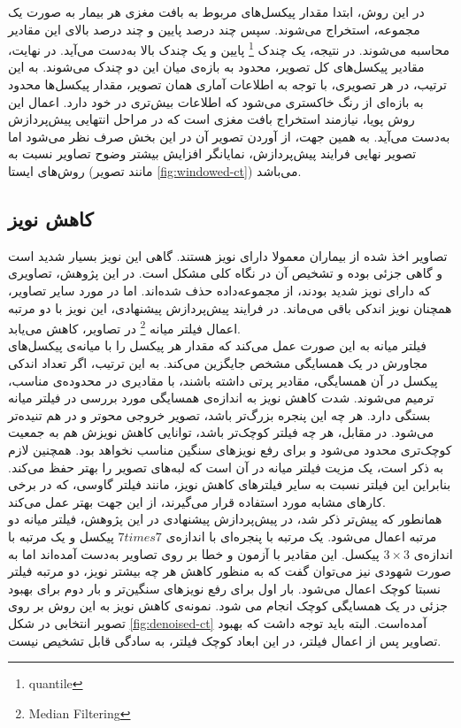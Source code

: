 در این روش، ابتدا مقدار پیکسل‌های مربوط به بافت مغزی هر بیمار به صورت یک مجموعه، استخراج می‌شوند.
سپس چند درصد پایین و چند درصد بالای این مقادیر محاسبه می‌شوند.
در نتیجه، یک چندک
\footnote{quantile} 
پایین و یک چندک بالا به‌دست می‌آید.
در نهایت، مقادیر پیکسل‌های کل تصویر، محدود به بازه‌ی میان این دو چندک می‌شوند.
به این ترتیب، در هر تصویری، با توجه به اطلاعات آماری همان تصویر، 
مقدار پیکسل‌ها محدود به بازه‌ای از رنگ خاکستری می‌شود که اطلاعات بیش‌تری در خود دارد.
اعمال این روش پویا، نیازمند استخراج بافت مغزی است که در مراحل انتهایی پیش‌پردازش به‌دست می‌آید.
به همین جهت، از آوردن تصویر آن در این بخش صرف نظر می‌شود
اما تصویر نهایی فرایند پیش‌پردازش، نمایانگر افزایش بیشتر وضوح 
تصاویر نسبت به روش‌های ایستا (مانند تصویر \ref{fig:windowed-ct}) می‌باشد.\\

\subsection{کاهش نویز}

تصاویر اخذ شده از بیماران معمولا دارای نویز هستند.
گاهی این نویز بسیار شدید است و گاهی جزئی بوده و تشخیص آن در نگاه کلی مشکل است.
در این پژوهش، تصاویری که دارای نویز شدید بودند، از مجموعه‌داده حذف شده‌اند.
اما در مورد سایر تصاویر، همچنان نویز اندکی باقی می‌ماند.
در فرایند پیش‌پردازش پیشنهادی، این نویز با دو مرتبه اعمال فیلتر میانه
\footnote{Median Filtering}
در تصاویر، کاهش می‌یابد.\\

فیلتر میانه به این صورت عمل می‌کند که مقدار هر پیکسل را 
با میانه‌ی پیکسل‌های مجاورش در یک همسایگی مشخص جایگزین می‌کند.
به این ترتیب، اگر تعداد اندکی پیکسل در آن همسایگی، مقادیر پرتی داشته باشند، با مقادیری در محدوده‌ی مناسب، ترمیم می‌شوند.
شدت کاهش نویز به اندازه‌ی همسایگی مورد بررسی در فیلتر میانه بستگی دارد.
هر چه این پنجره بزرگ‌تر باشد، تصویر خروجی محو‌تر و در هم تنیده‌تر
می‌شود.
در مقابل، هر چه فیلتر کوچک‌تر باشد، توانایی کاهش نویزش هم به جمعیت کوچک‌تری محدود می‌شود و برای رفع نویز‌های سنگین مناسب نخواهد بود.
همچنین لازم به ذکر است، یک مزیت فیلتر میانه در آن است که لبه‌های تصویر را بهتر حفظ می‌کند.
بنابراین این فیلتر نسبت به سایر فیلتر‌های کاهش نویز، مانند فیلتر گاوسی، که در برخی کارهای مشابه مورد استفاده قرار می‌گیرند، از این جهت بهتر عمل می‌کند.\\

همانطور که پیش‌تر ذکر شد، در پیش‌پردازش پیشنهادی در این پژوهش، فیلتر میانه دو مرتبه اعمال می‌شود. 
یک مرتبه با پنجره‌ای با اندازه‌ی $7times7$ پیکسل و یک مرتبه با اندازه‌ی $3\times3$ پیکسل.
این مقادیر با آزمون و خطا بر روی تصاویر به‌دست آمده‌اند اما به صورت شهودی نیز می‌توان گفت که به منظور کاهش هر چه بیشتر نویز، دو مرتبه فیلتر نسبتا کوچک اعمال می‌شود.
بار اول برای رفع نویز‌های سنگین‌تر و بار دوم برای بهبود جزئی در یک همسایگی کوچک انجام می شود.
نمونه‌ی کاهش نویز به این روش بر روی تصویر انتخابی 
در شکل
\ref{fig:denoised-ct}
آمده‌است.
البته باید توجه داشت که بهبود تصاویر پس از اعمال فیلتر، در این ابعاد کوچک فیلتر، به سادگی قابل تشخیص نیست.

